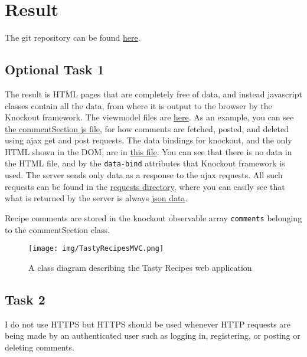 \documentclass[a4paper]{scrreprt}
\newcommand{\code}[1]{\texttt{#1}}
\begin{document}
\chapter{Result}
\label{sec:result}

The git repository can be found \href{https://github.com/fongie/TastyRecipes/tree/assignment4}{here}.

\section{Optional Task 1}

The result is HTML pages that are completely free of data, and instead javascript classes contain all the data, from where it is output to the browser by the Knockout framework.
The viewmodel files are \href{https://github.com/fongie/TastyRecipes/tree/assignment4/src/view/viewmodel}{here}. As an example, you can see \href{https://github.com/fongie/TastyRecipes/tree/assignment4/src/view/viewmodel/commentSection}{the commentSection js file}, for how comments are fetched, posted, and deleted using ajax get and post requests. The data bindings for knockout, and the only HTML shown in the DOM, are in \href{https://github.com/fongie/TastyRecipes/tree/assignment4/src/view/parts/comments.php}{this file}. You can see that there is no data in the HTML file, and by the \code{data-bind} attributes that Knockout framework is used. The server sends only data as a response to the ajax requests. All such requests can be found in the \href{https://github.com/fongie/TastyRecipes/tree/assignment4/src/view/requests}{requests directory}, where you can easily see that what is returned by the server is always \href{https://github.com/fongie/TastyRecipes/blob/b3511142454b98a722c9f1fa76f3680c740ec1b4/src/view/requests/get\_comments.php#L8}{json data}.

Recipe comments are stored in the knockout observable array \code{comments} belonging to the {commentSection} class.


\begin{figure}[h!]
  \begin{center}
    \texttt{[image: img/TastyRecipesMVC.png]}
    \caption{A class diagram describing the Tasty Recipes web application}
    \label{fig:classdia}
  \end{center}
\end{figure}

\section{Task 2}
I do not use HTTPS but HTTPS should be used whenever HTTP requests are being made by an authenticated user such as logging in, registering, or posting or deleting comments.
\end{document}
